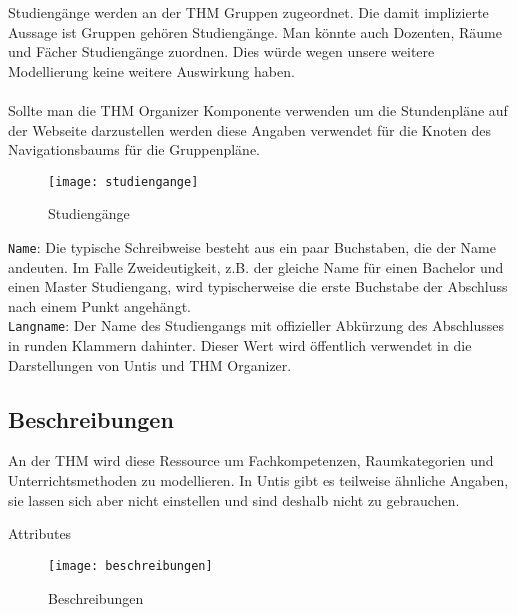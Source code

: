 Studiengänge werden an der THM Gruppen zugeordnet. Die damit implizierte Aussage ist Gruppen gehören Studiengänge. Man könnte auch Dozenten, Räume und Fächer Studiengänge zuordnen. Dies würde wegen unsere weitere Modellierung keine weitere Auswirkung haben.\\
\\
Sollte man die THM Organizer Komponente verwenden um die Stundenpläne auf der Webseite darzustellen werden diese Angaben verwendet für die Knoten des Navigationsbaums für die Gruppenpläne.\\

\newpage

\begin{wrapfigure}{r}{0.4\textwidth}
	\centering
	\vspace{-4pt}
	\texttt{[image: studiengange]}
	\vspace{-5pt}
	\caption{Studiengänge}
	\label{fig:studiengange}
\end{wrapfigure}

\noindent
\texttt{Name}: Die typische Schreibweise besteht aus ein paar Buchstaben, die der Name andeuten. Im Falle Zweideutigkeit, z.B. der gleiche Name für einen Bachelor und einen Master Studiengang, wird typischerweise die erste Buchstabe der Abschluss nach einem Punkt angehängt.\\

\noindent
\texttt{Langname}: Der Name des Studiengangs mit offizieller Abkürzung des Abschlusses in runden Klammern dahinter. Dieser Wert wird öffentlich verwendet in die Darstellungen von Untis und THM Organizer.\\

\subsection{Beschreibungen}

An der THM wird diese Ressource um Fachkompetenzen, Raumkategorien und Unterrichtsmethoden zu modellieren. In Untis gibt es teilweise ähnliche Angaben, sie lassen sich aber nicht einstellen und sind deshalb nicht zu gebrauchen.\\

\noindent
{\large Attributes\par}
\vspace{8pt}

\begin{wrapfigure}{r}{0.4\textwidth}
	\centering
	\vspace{-19pt}
	\texttt{[image: beschreibungen]}
	\vspace{-15pt}
	\caption{Beschreibungen}
	\label{fig:beschreibungen}
	\vspace{-5pt}
\end{wrapfigure}

